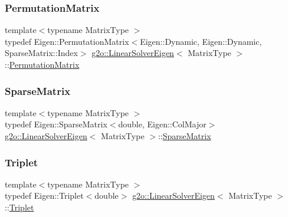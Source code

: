 \subsubsection{\texorpdfstring{Permutation\+Matrix}{PermutationMatrix}}
{\footnotesize\ttfamily template$<$typename Matrix\+Type $>$ \\
typedef Eigen\+::\+Permutation\+Matrix$<$Eigen\+::\+Dynamic, Eigen\+::\+Dynamic, Sparse\+Matrix\+::\+Index$>$ \mbox{\hyperlink{classg2o_1_1_linear_solver_eigen}{g2o\+::\+Linear\+Solver\+Eigen}}$<$ Matrix\+Type $>$\+::\mbox{\hyperlink{classg2o_1_1_linear_solver_eigen_acd9dd4e15dfbbad2720f1b83519333e8}{Permutation\+Matrix}}}

\mbox{\label{classg2o_1_1_linear_solver_eigen_aeb7e2400bed3a249b5f29ce7cc00cd33}} 
\subsubsection{\texorpdfstring{Sparse\+Matrix}{SparseMatrix}}
{\footnotesize\ttfamily template$<$typename Matrix\+Type $>$ \\
typedef Eigen\+::\+Sparse\+Matrix$<$double, Eigen\+::\+Col\+Major$>$ \mbox{\hyperlink{classg2o_1_1_linear_solver_eigen}{g2o\+::\+Linear\+Solver\+Eigen}}$<$ Matrix\+Type $>$\+::\mbox{\hyperlink{classg2o_1_1_linear_solver_eigen_aeb7e2400bed3a249b5f29ce7cc00cd33}{Sparse\+Matrix}}}

\mbox{\label{classg2o_1_1_linear_solver_eigen_a602c24e05d2f46022aa1827fdbc45638}} 
\subsubsection{\texorpdfstring{Triplet}{Triplet}}
{\footnotesize\ttfamily template$<$typename Matrix\+Type $>$ \\
typedef Eigen\+::\+Triplet$<$double$>$ \mbox{\hyperlink{classg2o_1_1_linear_solver_eigen}{g2o\+::\+Linear\+Solver\+Eigen}}$<$ Matrix\+Type $>$\+::\mbox{\hyperlink{classg2o_1_1_linear_solver_eigen_a602c24e05d2f46022aa1827fdbc45638}{Triplet}}}




